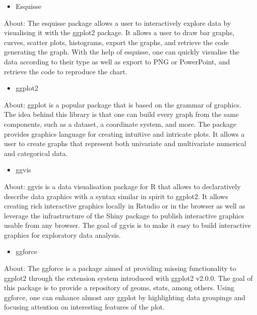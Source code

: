 \documentclass[
]{report}
\providecommand{\tightlist}{%
  \setlength{\itemsep}{0pt}\setlength{\parskip}{0pt}}
\begin{document}
\begin{itemize}
\tightlist
\item
  Esquisse
\end{itemize}

About: The esquisse package allows a user to interactively explore data by visualising it with the ggplot2 package. It allows a user to draw bar graphs, curves, scatter plots, histograms, export the graphs, and retrieve the code generating the graph. With the help of esquisse, one can quickly visualise the data according to their type as well as export to PNG or PowerPoint, and retrieve the code to reproduce the chart.

\begin{itemize}
\tightlist
\item
  ggplot2
\end{itemize}

About: ggplot is a popular package that is based on the grammar of graphics. The idea behind this library is that one can build every graph from the same components, such as a dataset, a coordinate system, and more. The package provides graphics language for creating intuitive and intricate plots. It allows a user to create graphs that represent both univariate and multivariate numerical and categorical data.

\begin{itemize}
\tightlist
\item
  ggvis
\end{itemize}

About: ggvis is a data visualisation package for R that allows to declaratively describe data graphics with a syntax similar in spirit to ggplot2. It allows creating rich interactive graphics locally in Rstudio or in the browser as well as leverage the infrastructure of the Shiny package to publish interactive graphics usable from any browser. The goal of ggvis is to make it easy to build interactive graphics for exploratory data analysis.

\begin{itemize}
\tightlist
\item
  ggforce
\end{itemize}

About: The ggforce is a package aimed at providing missing functionality to ggplot2 through the extension system introduced with ggplot2 v2.0.0. The goal of this package is to provide a repository of geoms, stats, among others. Using ggforce, one can enhance almost any ggplot by highlighting data groupings and focusing attention on interesting features of the plot.
\end{document}
